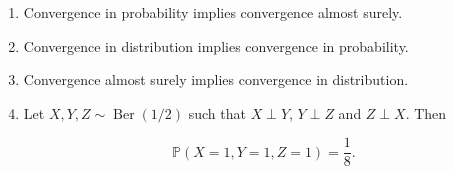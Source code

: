 \begin{quiz}

\begin{enumerate}
\item Convergence in probability implies convergence almost surely.

    \item Convergence in distribution implies convergence in probability.

    \item Convergence almost surely implies convergence in distribution.

    \item Let $X,Y,Z\sim\operatorname{Ber}(1/2)$ such that
    $X\perp Y$, $Y\perp Z$ and $Z\perp X$. Then

       $$ \mathbb{P}(X=1,Y=1,Z=1)=\frac{1}{8}.$$
\end{enumerate}

\end{quiz}


